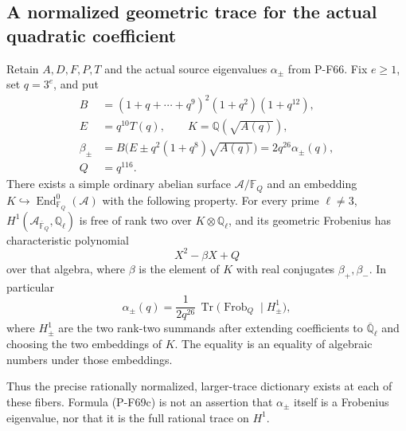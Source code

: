 \subsection{A normalized geometric trace for the actual quadratic coefficient}

\begin{proposition}
\label{prop:nonstandardhondatrace}
Retain $A,D,F,P,T$ and the actual source eigenvalues
$\alpha_\pm$ from P-F66.  Fix $e\ge1$, set $q=3^e$, and put
\[
\begin{split}
 B&=(1+q+\cdots+q^9)^2(1+q^2)(1+q^{12}),\\
 E&=q^{10}T(q),\qquad K=\mathbb Q(\sqrt{A(q)}),\\
 \beta_\pm&=B\bigl(E\pm q^2(1+q^8)\sqrt{A(q)}\bigr)
                  =2q^{26}\alpha_\pm(q),\\
 Q&=q^{116}.
\end{split}                                                   \tag{P-F69a}
\]
There exists a simple ordinary abelian surface
$\mathcal A/\mathbb F_Q$ and an embedding
$K\hookrightarrow\operatorname{End}_{\mathbb F_Q}^0(\mathcal A)$
with the following property.  For every prime $\ell\ne3$,
$H^1(\mathcal A_{\overline{\mathbb F}_Q},\mathbb Q_\ell)$
is free of rank two over $K\otimes\mathbb Q_\ell$, and its
geometric Frobenius has characteristic polynomial
\[
                      X^2-\beta X+Q                            \tag{P-F69b}
\]
over that algebra, where $\beta$ is the element of $K$ with
real conjugates $\beta_+,\beta_-$.  In particular
\[
 \alpha_\pm(q)=\frac{1}{2q^{26}}\,
       \operatorname{Tr}\bigl(\operatorname{Frob}_Q
                    \mid H^1_\pm\bigr),                       \tag{P-F69c}
\]
where $H^1_\pm$ are the two rank-two summands after extending
coefficients to $\overline{\mathbb Q}_\ell$ and choosing the
two embeddings of $K$.  The equality is an equality of algebraic
numbers under those embeddings.

Thus the precise rationally normalized, larger-trace dictionary
exists at each of these fibers.  Formula (P-F69c) is not an
assertion that $\alpha_\pm$ itself is a Frobenius eigenvalue,
nor that it is the full rational trace on $H^1$.
\end{proposition}

